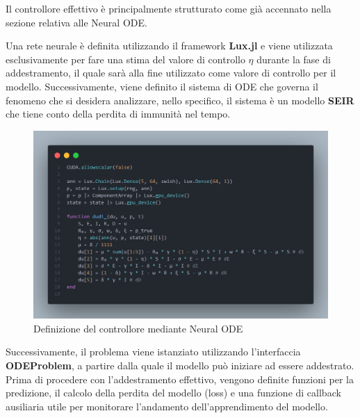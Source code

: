 Il controllore effettivo è principalmente strutturato come già 
accennato nella sezione relativa alle Neural ODE.

Una rete neurale è definita utilizzando il framework 
\textbf{Lux.jl} \cite{pal2023lux} e viene utilizzata esclusivamente per 
fare una stima del valore di controllo $\eta$ durante la fase di 
addestramento, il quale sarà alla fine utilizzato come valore di 
controllo per il modello. Successivamente, viene definito il sistema 
di ODE che governa il fenomeno che si desidera analizzare, 
nello specifico, il sistema è un modello \textbf{SEIR} che tiene 
conto della perdita di immunità nel tempo.

\begin{figure}[H]
    \begin{center}
		\includegraphics[width=\textwidth]{img/fann.png}
		\caption{Definizione del controllore mediante Neural ODE}
		\label{fig:controller1}
	\end{center}
\end{figure}

Successivamente, il problema viene istanziato utilizzando 
l'interfaccia \textbf{ODEProblem}, a partire dalla quale il modello 
può iniziare ad essere addestrato. Prima di procedere con 
l'addestramento effettivo, vengono definite funzioni per la predizione, 
il calcolo della perdita del modello (loss) e una funzione di callback 
ausiliaria utile per monitorare l'andamento dell'apprendimento del modello.

